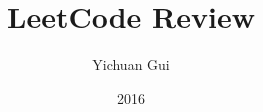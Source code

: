 \documentclass[12pt]{report}
\begin{document}
\title{\bf LeetCode Review}
\author{Yichuan Gui}
\date{2016}
\maketitle

\tableofcontents
\cleardoublepage

\newpage
\setcounter{page}{1}
\cleardoublepage
















\end{document}
